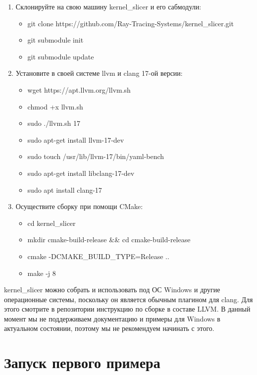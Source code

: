\documentclass[11pt,fleqn,english,russian]{report} %
\begin{document}
\begin{enumerate}
	
\item Склонируйте на свою машину kernel\_slicer и его сабмодули: \begin{itemize}
	\item git clone https://github.com/Ray-Tracing-Systems/kernel\_slicer.git
	\item git submodule init
	\item git submodule update
\end{itemize}

\item Установите в своей системе llvm и clang 17-ой версии: \begin{itemize}
	\item wget https://apt.llvm.org/llvm.sh
	\item chmod +x llvm.sh
	\item sudo ./llvm.sh 17
	\item sudo apt-get install llvm-17-dev
	\item sudo touch /usr/lib/llvm-17/bin/yaml-bench
	\item sudo apt-get install libclang-17-dev
	\item sudo apt install clang-17
\end{itemize}

\item Осуществите сборку при помощи CMake: 
\begin{itemize}
	\item cd kernel\_slicer
    \item mkdir cmake-build-release \&\& cd cmake-build-release
    \item cmake -DCMAKE\_BUILD\_TYPE=Release .. 
    \item make -j 8
\end{itemize}

\end{enumerate}

\begin{remark}
	kernel\_slicer можно собрать и использовать под ОС Windows и другие операционные системы, поскольку он является обычным плагином для clang. Для этого смотрите в репозитории инструкцию по сборке в составе LLVM. В данный момент мы не поддерживаем документацию и примеры для Windows в актуальном состоянии, поэтому мы не рекомендуем начинать с этого. 
\end{remark}

\pagebreak
\section{Запуск первого примера}
\end{document}
